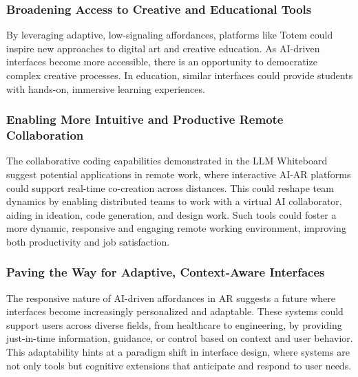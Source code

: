 
\subsubsection{Broadening Access to Creative and Educational Tools}
By leveraging adaptive, low-signaling affordances, platforms like Totem could inspire new approaches to digital art and creative education.
As AI-driven interfaces become more accessible, there is an opportunity to democratize complex creative processes.%
In education, similar interfaces could provide students with hands-on, immersive learning experiences.%


\subsubsection{Enabling More Intuitive and Productive Remote Collaboration}
The collaborative coding capabilities demonstrated in the LLM Whiteboard suggest potential applications in remote work, where interactive AI-AR platforms could support real-time co-creation across distances.
This could reshape team dynamics by enabling distributed teams to work with a virtual AI collaborator, aiding in ideation, code generation, and design work.
Such tools could foster a more dynamic, responsive and engaging remote working environment, improving both productivity and job satisfaction.

\subsubsection{Paving the Way for Adaptive, Context-Aware Interfaces}
The responsive nature of AI-driven affordances in AR suggests a future where interfaces become increasingly personalized and adaptable.
These systems could support users across diverse fields, from healthcare to engineering, by providing just-in-time information, guidance, or control based on context and user behavior.
This adaptability hints at a paradigm shift in interface design, where systems are not only tools but cognitive extensions that anticipate and respond to user needs.

